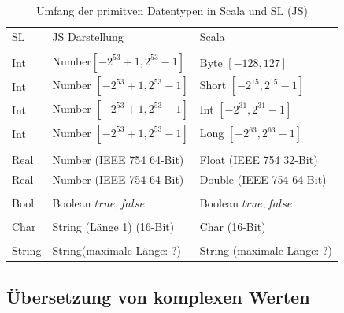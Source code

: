 \documentclass[12pt]{scrreprt}
\begin{document}
\begin{table}
\caption{Umfang der primitven Datentypen in Scala und \ac{SL} (\ac{JS})}
\centering
\begin{tabular}{lll}
 \ac{SL} &    \ac{JS} Darstellung              &    Scala \\
\\
Int  &  Number\footnotemark $[-2^{53} + 1, 2^{53} -1]$   &  Byte  $[-128, 127]$\\
Int  &  Number $[-2^{53} + 1, 2^{53} -1]$   &  Short $[-2^{15}, 2^{15}-1]$\\
Int  & Number $[-2^{53} + 1, 2^{53} -1]$    & Int   $[-2^{31}, 2^{31}-1]$\\
Int  &  Number $[-2^{53} + 1, 2^{53} -1]$   &  Long  $[-2^{63}, 2^{63}-1]$\\
\\
Real &  Number (IEEE 754 64-Bit)      &  Float  (IEEE 754 32-Bit)\\
Real &  Number (IEEE 754 64-Bit)      &  Double (IEEE 754 64-Bit)\\
\\
Bool &  Boolean ${true, false}$         &  Boolean ${true, false}$\\
\\
Char &  String (Länge 1) (16-Bit)     &  Char (16-Bit)\\
\\
String& String\footnotemark (maximale Länge: ?)    &  String (maximale Länge: ?)\\
\end{tabular}
\label{tab:primitives-borders}
\end{table}

\subsection{Übersetzung von komplexen Werten}
\end{document}
